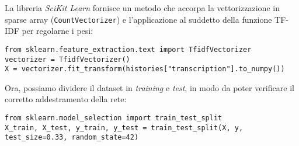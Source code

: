 La libreria \textit{SciKit Learn} fornisce un metodo che accorpa la vettorizzazione in sparse array (\texttt{CountVectorizer}) e l'applicazione al suddetto della funzione TF-IDF per regolarne i pesi:
\begin{verbatim}
from sklearn.feature_extraction.text import TfidfVectorizer
vectorizer = TfidfVectorizer()
X = vectorizer.fit_transform(histories["transcription"].to_numpy())
\end{verbatim}
Ora, possiamo dividere il dataset in \textit{training} e \textit{test}, in modo da poter verificare il corretto addestramento della rete:
\begin{verbatim}
from sklearn.model_selection import train_test_split
X_train, X_test, y_train, y_test = train_test_split(X, y, test_size=0.33, random_state=42)
\end{verbatim}
